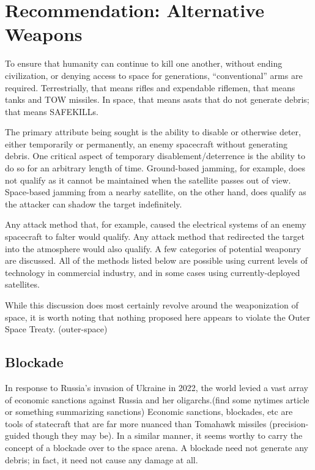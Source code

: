 \section{Recommendation: Alternative Weapons}

To ensure that humanity can continue to kill one another, without
ending civilization, or denying access to space for generations,
``conventional'' arms are required.  Terrestrially, that means rifles
and expendable riflemen, that means tanks and TOW missiles.  In space,
that means \acp{asat} that do not generate debris; that means
SAFEKILLs.

The primary attribute being sought is the ability to disable or
otherwise deter, either temporarily or permanently, an enemy
spacecraft without generating debris.  One critical aspect of
temporary disablement/deterrence is the ability to do so for an
arbitrary length of time.  Ground-based jamming, for example, does not
qualify as it cannot be maintained when the satellite passes out of
view.  Space-based jamming from a nearby satellite, on the other hand,
does qualify as the attacker can shadow the target indefinitely.

Any attack method that, for example, caused the electrical systems of
an enemy spacecraft to falter would qualify.  Any attack method that
redirected the target into the atmosphere would also qualify.  A few
categories of potential weaponry are discussed.  All of the methods
listed below are possible using current levels of technology in
commercial industry, and in some cases using currently-deployed
satellites.

While this discussion does most certainly revolve around the
weaponization of space, it is worth noting that nothing proposed here
appears to violate the Outer Space Treaty. (outer-space)

\subsection{Blockade}
In response to Russia's invasion of Ukraine in 2022, the world levied
a vast array of economic sanctions against Russia and her
oligarchs.(find some nytimes article or something summarizing
sanctions) Economic sanctions, blockades, etc are tools of statecraft
that are far more nuanced than Tomahawk missiles (precision-guided
though they may be).  In a similar manner, it seems worthy to carry
the concept of a blockade over to the space arena.  A blockade need
not generate any debris; in fact, it need not cause any damage at all.

